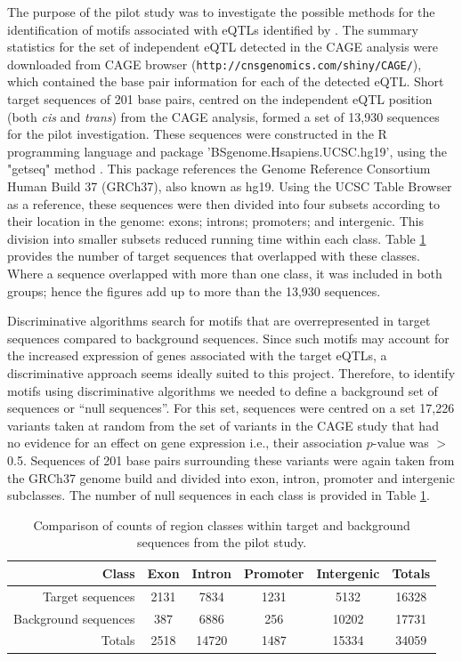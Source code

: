 \documentclass[12pt]{article}
\begin{document}
The purpose of the pilot study was to investigate the possible methods for the identification of motifs associated with eQTLs identified by  \citet{lloyd2017genetic}. The summary statistics for the set of independent eQTL detected in the CAGE analysis were downloaded from
CAGE browser (\texttt{http://cnsgenomics.com/shiny/CAGE/}), which contained the base pair information for each of the detected eQTL. Short target sequences of 201 base pairs, centred on the independent eQTL position (both \emph{cis} and \emph{trans}) from the CAGE analysis, formed a set of 13,930 sequences for the pilot investigation. These sequences were constructed in the R programming language \citep{rpackage} and package 'BSgenome.Hsapiens.UCSC.hg19'\citep{bsgenome2014}, using the "getseq" method \citep{pages}. This package references the Genome Reference Consortium Human Build 37 (GRCh37)\citep{Lander2001}, also known as hg19. Using the UCSC Table Browser \citep{karolchik2004ucsc} as a reference, these sequences were then divided into four subsets according to their location in the genome: exons; introns; promoters; and intergenic. This division into smaller subsets reduced running time within each class. Table \ref{freqComparisons} provides the number of target sequences that overlapped with these classes. Where a sequence overlapped with more than one class, it was included in both groups; hence the figures add up to more than the 13,930 sequences.

Discriminative algorithms search for motifs that are overrepresented in target sequences compared to background sequences. Since such motifs may account for the increased expression of genes associated with the target eQTLs, a discriminative approach seems ideally suited to this project.  Therefore, to identify motifs using discriminative algorithms we needed to define a background set of sequences or ``null sequences''. For this set, sequences were centred on a set 17,226 variants taken at random from the set of variants in the CAGE study that had no evidence for an effect on gene expression i.e., their association $p$-value was $>$ 0.5. Sequences of 201 base pairs surrounding these variants were again taken from the GRCh37 genome build and divided into exon, intron, promoter and intergenic subclasses. The number of null sequences in each class is provided in Table \ref{freqComparisons}. 

\begin{table}[!htbp]
\centering
\caption{Comparison of counts of region classes within target and background sequences from the pilot study.}\label{freqComparisons}
\begin{tabular}{rccccc}
 \toprule[0.2em]
Class & Exon & Intron & Promoter & Intergenic & Totals\\ 
\midrule[0.1em]
Target sequences & 2131 & 7834 & 1231 & 5132 & 16328\\
Background sequences & 387 & 6886 & 256 & 10202 & 17731\\
Totals & 2518 & 14720 & 1487 & 15334 & 34059\\
\bottomrule[0.2em]
\end{tabular}
\end{table} 
\newpage
\end{document}
